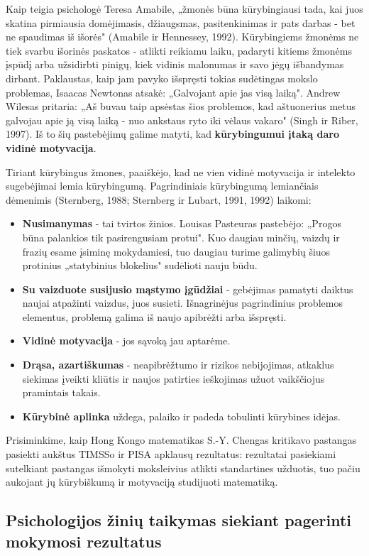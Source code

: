 \documentclass{article}
\begin{document}
Kaip teigia psichologė Teresa Amabile, „žmonės būna kūrybingiausi tada, kai juos skatina pirmiausia domėjimasis, džiaugsmas, pasitenkinimas ir pats darbas - bet ne spaudimas iš išorės" (Amabile ir Hennessey, 1992). Kūrybingiems žmonėms ne tiek svarbu išorinės paskatos - atlikti reikiamu laiku, padaryti kitiems žmonėms įspūdį arba užsidirbti pinigų, kiek vidinis malonumas ir savo jėgų išbandymas dirbant. Paklaustas, kaip jam pavyko išspręsti tokias sudėtingas mokslo problemas, Isaacas Newtonas atsakė: „Galvojant apie jas visą laiką". Andrew Wilesas pritaria: „Aš buvau taip apsėstas šios problemos, kad aštuonerius metus galvojau apie ją visą laiką - nuo ankstaus ryto iki vėlaus vakaro" (Singh ir Riber, 1997). Iš to šių pastebėjimų galime matyti, kad \textbf{kūrybingumui įtaką daro vidinė motyvacija}.

Tiriant kūrybingus žmones, paaiškėjo, kad ne vien vidinė motyvacija ir intelekto sugebėjimai lemia kūrybingumą. Pagrindiniais kūrybingumą lemiančiais dėmenimis (Sternberg, 1988; Sternberg ir Lubart, 1991, 1992) laikomi:
\begin{itemize}
\item \textbf{Nusimanymas} - tai tvirtos žinios. Louisas Pasteuras pastebėjo: „Progos būna palankios tik pasirengusiam protui". Kuo daugiau minčių, vaizdų ir frazių esame įsiminę mokydamiesi, tuo daugiau turime galimybių šiuos protinius „statybinius blokelius" sudėlioti nauju būdu.
\item \textbf{Su vaizduote susijusio mąstymo įgūdžiai} - gebėjimas pamatyti daiktus naujai atpažinti vaizdus, juos susieti. Išnagrinėjus pagrindinius problemos elementus, problemą galima iš naujo apibrėžti arba išspręsti.
\item \textbf {Vidinė motyvacija} - jos sąvoką jau aptarėme.
\item \textbf{Drąsa, azartiškumas} - neapibrėžtumo ir rizikos nebijojimas, atkaklus siekimas įveikti kliūtis ir naujos patirties ieškojimas užuot vaikščiojus pramintais takais.
\item \textbf{Kūrybinė aplinka} uždega, palaiko ir padeda tobulinti kūrybines idėjas.
\end{itemize}

Prisiminkime, kaip Hong Kongo matematikas S.-Y. Chengas kritikavo pastangas pasiekti aukštus TIMSSo ir PISA apklausų rezultatus: rezultatai pasiekiami sutelkiant pastangas išmokyti moksleivius atlikti standartines užduotis, tuo pačiu aukojant jų kūrybiškumą ir motyvaciją studijuoti matematiką.

\subsection{Psichologijos žinių taikymas siekiant pagerinti mokymosi rezultatus}
\end{document}
